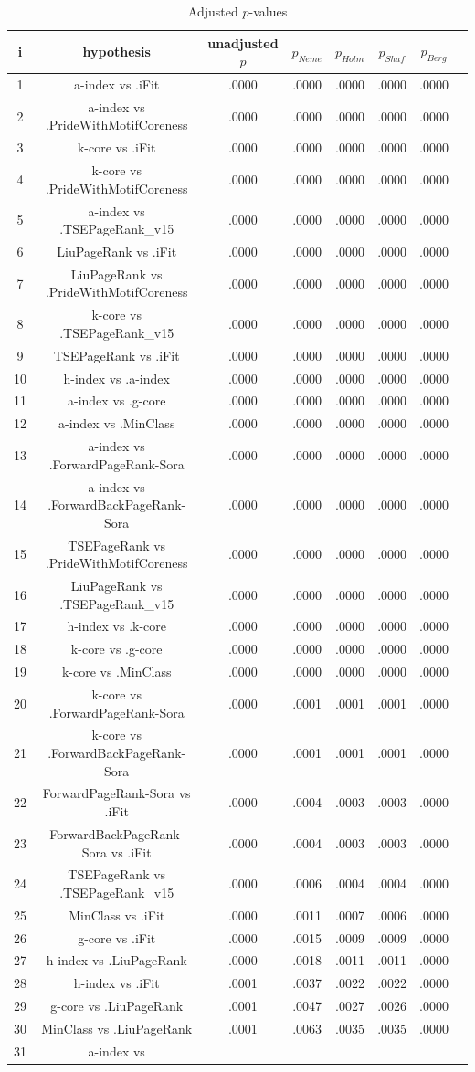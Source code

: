 \documentclass[a4paper,10pt]{article}
\begin{document}
\begin{landscape}
\begin{table}[!htp]
\centering\tiny
\caption{Adjusted $p$-values}
\begin{tabular}{cccccccc}
i&hypothesis&unadjusted $p$&$p_{Neme}$&$p_{Holm}$&$p_{Shaf}$&$p_{Berg}$\\
\hline
1&a-index vs .iFit&.0000&.0000&.0000&.0000&.0000\\2&a-index vs .PrideWithMotifCoreness&.0000&.0000&.0000&.0000&.0000\\3&k-core vs .iFit&.0000&.0000&.0000&.0000&.0000\\4&k-core vs .PrideWithMotifCoreness&.0000&.0000&.0000&.0000&.0000\\5&a-index vs .TSEPageRank_v15&.0000&.0000&.0000&.0000&.0000\\6&LiuPageRank vs .iFit&.0000&.0000&.0000&.0000&.0000\\7&LiuPageRank vs .PrideWithMotifCoreness&.0000&.0000&.0000&.0000&.0000\\8&k-core vs .TSEPageRank_v15&.0000&.0000&.0000&.0000&.0000\\9&TSEPageRank vs .iFit&.0000&.0000&.0000&.0000&.0000\\10&h-index vs .a-index&.0000&.0000&.0000&.0000&.0000\\11&a-index vs .g-core&.0000&.0000&.0000&.0000&.0000\\12&a-index vs .MinClass&.0000&.0000&.0000&.0000&.0000\\13&a-index vs .ForwardPageRank-Sora&.0000&.0000&.0000&.0000&.0000\\14&a-index vs .ForwardBackPageRank-Sora&.0000&.0000&.0000&.0000&.0000\\15&TSEPageRank vs .PrideWithMotifCoreness&.0000&.0000&.0000&.0000&.0000\\16&LiuPageRank vs .TSEPageRank_v15&.0000&.0000&.0000&.0000&.0000\\17&h-index vs .k-core&.0000&.0000&.0000&.0000&.0000\\18&k-core vs .g-core&.0000&.0000&.0000&.0000&.0000\\19&k-core vs .MinClass&.0000&.0000&.0000&.0000&.0000\\20&k-core vs .ForwardPageRank-Sora&.0000&.0001&.0001&.0001&.0000\\21&k-core vs .ForwardBackPageRank-Sora&.0000&.0001&.0001&.0001&.0000\\22&ForwardPageRank-Sora vs .iFit&.0000&.0004&.0003&.0003&.0000\\23&ForwardBackPageRank-Sora vs .iFit&.0000&.0004&.0003&.0003&.0000\\24&TSEPageRank vs .TSEPageRank_v15&.0000&.0006&.0004&.0004&.0000\\25&MinClass vs .iFit&.0000&.0011&.0007&.0006&.0000\\26&g-core vs .iFit&.0000&.0015&.0009&.0009&.0000\\27&h-index vs .LiuPageRank&.0000&.0018&.0011&.0011&.0000\\28&h-index vs .iFit&.0001&.0037&.0022&.0022&.0000\\29&g-core vs .LiuPageRank&.0001&.0047&.0027&.0026&.0000\\30&MinClass vs .LiuPageRank&.0001&.0063&.0035&.0035&.0000\\31&a-index vs 
\end{tabular}
\end{table}
\end{landscape}
\end{document}

